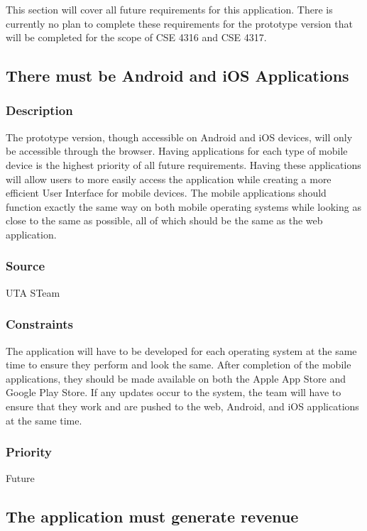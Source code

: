 This section will cover all future requirements for this application. There is currently no plan to complete these requirements for the prototype version that will be completed for the scope of CSE 4316 and CSE 4317.

\subsection{There must be Android and iOS Applications}
\subsubsection{Description}
The prototype version, though accessible on Android and iOS devices, will only be accessible through the browser. Having applications for each type of mobile device is the highest priority of all future requirements. Having these applications will allow users to more easily access the application while creating a more efficient User Interface for mobile devices. The mobile applications should function exactly the same way on both mobile operating systems while looking as close to the same as possible, all of which should be the same as the web application.
\subsubsection{Source}
UTA STeam
\subsubsection{Constraints}
The application will have to be developed for each operating system at the same time to ensure they perform and look the same. After completion of the mobile applications, they should be made available on both the Apple App Store and Google Play Store. If any updates occur to the system, the team will have to ensure that they work and are pushed to the web, Android, and iOS applications at the same time.
\subsubsection{Priority}
Future

\subsection{The application must generate revenue}
